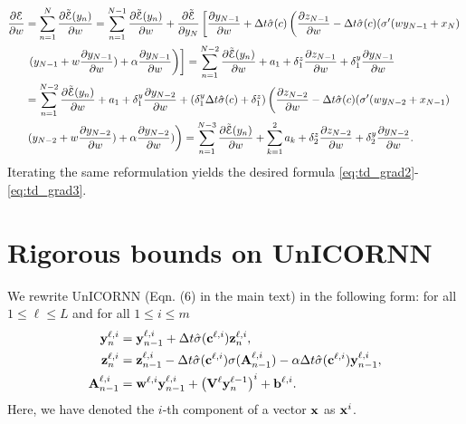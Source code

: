 \documentclass{article}
\newcommand{\by}{{\bf y}}
\newcommand{\bb}{{\bf b}}
\newcommand{\bV}{{\bf V}}
\newcommand{\Dt}{{\Delta t}}
\newcommand{\E}{\EuScript{E}}
\newcommand{\byli}{{\bf y}^{\ell,i}}
\newcommand{\bzli}{{\bf z}^{\ell,i}}
\newcommand{\cli}{\hat{\sigma}({\bf c}^{\ell,i})}
\newcommand{\Ali}{{\bf A}^{\ell,i}}
\newcommand{\sli}{\sigma({\bf A}^{\ell,i}_{n-1})}
\newcommand{\bwli}{{\bf w}^{\ell,i}}
\begin{document}
\begin{align*}
    \frac{\partial \E}{\partial w} &= \sum_{n=1}^N \frac{\partial \Tilde{\E}(y_n)}{\partial w} = \sum_{n=1}^{N-1} \frac{\partial \Tilde{\E}(y_n)}{\partial w} + \frac{\partial \Tilde{\E}}{\partial y_N} \left[\frac{\partial y_{N-1}}{\partial w} + \Dt\hat{\sigma}(c) \left( \frac{\partial z_{N-1}}{\partial w} - \Dt\hat{\sigma}(c)(\sigma^\prime(wy_{N-1} + x_N) \right. \right. \\
    &\left. \left. (y_{N-1}+w\frac{\partial y_{N-1}}{\partial w}  ) + \alpha \frac{\partial y_{N-1}}{\partial w}\right) \right]
    = \sum_{n=1}^{N-2} \frac{\partial \Tilde{\E}(y_n)}{\partial w} + a_1 + \delta^z_1\frac{\partial z_{N-1}}{\partial w} + \delta^y_1\frac{\partial y_{N-1}}{\partial w} \\ &= \sum_{n=1}^{N-2} \frac{\partial \Tilde{\E}(y_n)}{\partial w} + a_1 + \delta_1^y\frac{\partial y_{N-2}}{\partial w} + (\delta_1^y\Dt\hat{\sigma}(c) + \delta^z_1)\left( \frac{\partial z_{N-2}}{\partial w} - \Dt\hat{\sigma}(c)( \sigma^\prime(wy_{N-2}+x_{N-1}) \right.\\
    &\left. (y_{N-2} + w\frac{\partial y_{N-2}}{\partial w} ) + \alpha \frac{\partial y_{N-2}}{\partial w} ) \right) = \sum_{n=1}^{N-3} \frac{\partial \Tilde{\E}(y_n)}{\partial w} + \sum_{k=1}^2 a_k + \delta^z_2\frac{\partial z_{N-2}}{\partial w} + \delta^y_2\frac{\partial y_{N-2}}{\partial w}.
\end{align*}
Iterating the same reformulation yields the desired formula \eqref{eq:td_grad2}-\eqref{eq:td_grad3}.






\section{Rigorous bounds on UnICORNN}
We rewrite UnICORNN (Eqn. (6) in the main text) in the following form: for all $1 \leq \ell \leq L$ and for all $1 \leq i \leq m$
\begin{equation}
    \label{eq:ucrn_SM}
    \begin{aligned}
    \byli_n &= \byli_{n-1}  + \Dt \cli\bzli_n, \\
    \bzli_n &= \bzli_{n-1} -\Dt \cli\sli - \alpha \Dt \cli\byli_{n-1}, \\
    \Ali_{n-1} &= \bwli\byli_{n-1} +\left(\bV^\ell \by^{\ell-1}_n\right)^i + \bb^{\ell,i}. 
    \end{aligned}
\end{equation}
Here, we have denoted the $i$-th component of a vector ${\bf x}$ as ${\bf x}^i$.
\end{document}
